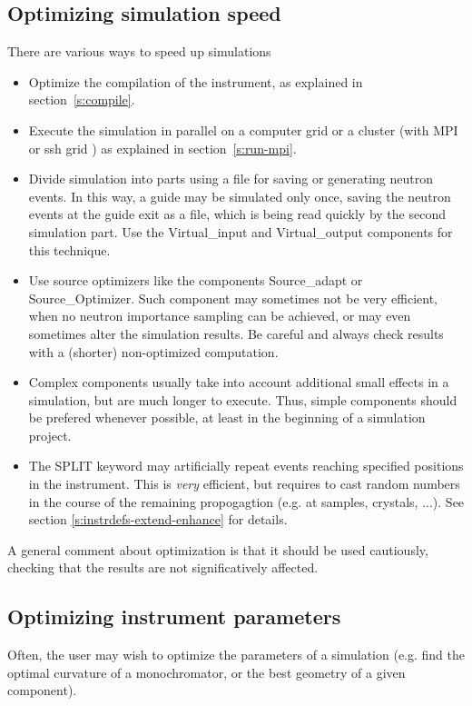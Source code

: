 \subsection{Optimizing simulation speed}
\label{s:optim}
There are various ways to speed up simulations
\begin{itemize}
\item Optimize the compilation of the instrument, as explained in section~\ref{s:compile}.
\item Execute the simulation in parallel on a computer grid or a cluster (with MPI or ssh grid
) as explained in section~\ref{s:run-mpi}.
\item Divide simulation into parts using a file for saving or generating neutron
      events. In this way, a guide may be simulated only once, saving the neutron events
      at the guide exit as a file, which is being read quickly by the second simulation
      part. Use the Virtual\_input and Virtual\_output components for this technique.
\item Use source optimizers like the components Source\_adapt or
      Source\_Optimizer. Such component may sometimes not be very efficient, when no
      neutron importance sampling can be achieved, or may even sometimes alter the
      simulation results. Be careful and always check results with a
      (shorter) non-optimized
      computation.
\item Complex components usually take into account additional small effects in a simulation,
      but are much longer to execute. Thus, simple components should be prefered
      whenever possible, at least in the beginning of a simulation project.
\item The SPLIT keyword may artificially repeat events reaching specified positions in the
      instrument. This is \emph{very} efficient, but requires to cast random numbers in the course of
      the remaining propogagtion (e.g. at samples, crystals, ...). See section \ref{s:instrdefs-extend-enhance} for details.
\end{itemize}
A general comment about optimization is that it should be used cautiously, checking that the results are not significatively affected.

\subsection{Optimizing instrument parameters}
\label{s:optimize}
Often, the user may wish to optimize the parameters of a simulation (e.g. find the optimal curvature of a monochromator, or the best geometry of a given component).

